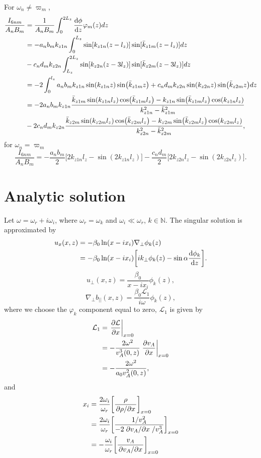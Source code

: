 \documentclass{article}
\begin{document}
For $\omega_n\ne \varpi_m$,
\[\begin{aligned}
\frac{I_{6nm}}{A_nB_m}&=\frac{1}{A_nB_m}\int_0^{2L_z}\dv{\phi}{z}\varphi_m(z)dz\\ 
&= -a_nb_m k_{z1n}\int_0^{L_z}\sin[k_{z1n}(z-l_z)]\sin[\bar{k}_{z1m}(z-l_z)] dz \\
&- c_nd_mk_{z2n}\int_{L_z}^{2L_z}\sin[k_{z2n}(z-3l_z)]\sin[\bar{k}_{z2m}(z-3l_z)] dz \\
&=-2\int_{0}^{l_z}a_nb_mk_{z1n}\sin(k_{z1n}z)\sin(\bar{k}_{z1m}z) + c_nd_mk_{z2n}\sin(k_{z2n}z)\sin(\bar{k}_{z2m}z)dz \\
&=-2a_nb_mk_{z1n}\frac{\bar{k}_{z1m}\sin(k_{z1n}l_z)\cos(\bar{k}_{z1m}l_z)-k_{z1n}\sin(\bar{k}_{z1m}l_z)\cos(k_{z1n}l_z)}{k_{z1n}^2-\bar{k}_{z1m}^2} \\
&-2c_nd_mk_{z2n}\frac{\bar{k}_{z2m}\sin(k_{z2m}l_z)\cos(\bar{k}_{z2m}l_z)-k_{z2m}\sin(\bar{k}_{z2m}l_z)\cos(k_{z2m}l_z)}{k_{z2n}^2-\bar{k}_{z2m}^2}, \\
\end{aligned}\]
for $\omega_n = \varpi_m$
\[\frac{I_{6nm}}{A_nB_m} = -\frac{a_nb_m}{2}\Big[2k_{z1n}l_z-\sin(2k_{z1n}l_z)\Big]-\frac{c_nd_m}{2}\Big[2k_{z2n}l_z-\sin(2k_{z2n}l_z)\Big].\]

\section*{Analytic solution}

Let $\omega = \omega_r + i \omega_i$, where $\omega_r = \omega_k$ and $\omega_i \ll \omega_r$, $k\in\mathds{N}$. The singular solution is approximated by 
\[\begin{aligned}
u_x(x,z) &= -\beta_0\ln(x-ix_i)\nabla_\perp \phi_k(z) \\
&= -\beta_0\ln(x-ix_i)\qty[ik_\perp \phi_k(z) - \sin\alpha\dv{\phi_k}{z}].
\end{aligned}\]
\[u_\perp(x,z) = \frac{\beta_0}{x-ix_i}\phi_k(z),\]
\[\nabla_\perp b_{||}(x,z) = \frac{\beta_0 \mathcal{L}_1}{i\omega}\phi_k(z),\]
where we choose the $\varphi_k$ component equal to zero, $\mathcal{L}_1$ is given by
\[\begin{aligned}
\mathcal{L}_1 &= \left.\pdv{\mathcal{L}}{x}\right|_{x=0} \\
&= -\frac{2\omega^2}{v_A^3(0,z)}\left.\pdv{v_A}{x}\right|_{x=0} \\
&= -\frac{2\omega^2}{a_0 v_A^2(0,z)}, \\
\end{aligned}\]
and
\[\begin{aligned}
x_i &= \frac{2\omega_i}{\omega_r}\qty[\frac{\rho}{\pdv*{\rho}{x}}]_{x=0} \\
&= \frac{2\omega_i}{\omega_r}\qty[\frac{1 / v_A^2}{-2\pdv*{v_A}{x}/v_A^3}]_{x=0} \\
&= -\frac{\omega_i}{\omega_r}\qty[\frac{v_A}{\pdv*{v_A}{x}}]_{x=0}
\end{aligned}\]
\end{document}

